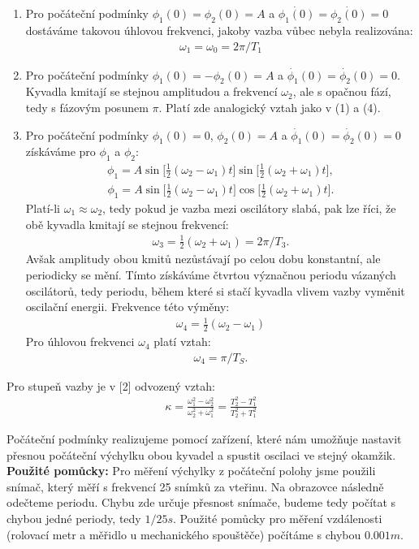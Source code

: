 \documentclass[a4paper]{article}
\begin{document}
\begin{enumerate}
\item Pro počáteční podmínky $\phi_1(0) = \phi_2(0) = A$ a $\Dot{\phi_1(0)} = \Dot{\phi_2(0)} = 0$ dostáváme  takovou úhlovou frekvenci, jakoby vazba vůbec nebyla realizována:
\begin{align}
    \omega_1 = \omega_0 = 2\pi/T_1
\end{align}
\item Pro počáteční podmínky $\phi_1(0) = -\phi_2(0) = A$ a $\Dot{\phi_1}(0) = \Dot{\phi_2}(0) = 0$. Kyvadla kmitají se stejnou amplitudou a frekvencí $\omega_2$, ale s opačnou fází, tedy s fázovým posunem $\pi$. Platí zde analogický vztah jako v (1) a (4). 
\item Pro počáteční podmínky $\phi_1(0)=0$, $\phi_2(0)=A$ a $\Dot{\phi_1}(0) = \Dot{\phi_2}(0) = 0$ získáváme pro $\phi_1$ a $\phi_2$:
\begin{align}
    \phi_1 = A\sin\Big[\frac{1}{2}(\omega_2-\omega_1)t\Big]\sin\Big[\frac{1}{2}(\omega_2+\omega_1)t\Big],
\end{align}
\begin{align}
    \phi_1 = A\sin\Big[\frac{1}{2}(\omega_2-\omega_1)t\Big]\cos\Big[\frac{1}{2}(\omega_2+\omega_1)t\Big].
\end{align}
Platí-li $\omega_1 \approx \omega_2$, tedy pokud je vazba mezi oscilátory slabá, pak lze říci, že obě kyvadla kmitají se stejnou frekvencí:
\begin{align}
    \omega_3 = \frac{1}{2}(\omega_2 + \omega_1) = 2\pi/T_3.
\end{align}
Avšak amplitudy obou kmitů nezůstávají po celou dobu konstantní, ale periodicky se mění. Tímto získáváme čtvrtou význačnou periodu vázaných oscilátorů, tedy periodu, během které si stačí kyvadla vlivem vazby vyměnit oscilační energii. Frekvence této výměny:
\begin{align}
    \omega_4 = \frac{1}{2}(\omega_2-\omega_1)
\end{align}
Pro úhlovou frekvenci $\omega_4$ platí vztah:
\begin{align}
    \omega_4 = \pi/T_S.
\end{align}
\end{enumerate}
\par Pro stupeň vazby je v [2] odvozený vztah:
\begin{align}
    \kappa = \frac{\omega_1^2-\omega_2^2}{\omega_2^2+\omega_1^2} = \frac{T_2^2-T_1^2}{T_2^2+T_1^2}
\end{align}
\par Počáteční podmínky realizujeme pomocí zařízení, které nám umožňuje nastavit přesnou počáteční výchylku obou kyvadel a spustit oscilaci ve stejný okamžik. 
\newline
\newline \textbf{Použité pomůcky:}
\newline Pro měření výchylky z  počáteční polohy jsme použili snímač, který měří s frekvencí 25 snímků za vteřinu. Na obrazovce následně odečteme periodu. Chybu zde určuje přesnost snímače, budeme tedy počítat s chybou jedné periody, tedy $1/25 s$. Použité pomůcky pro měření vzdálenosti (rolovací metr a měřidlo u mechanického spouštěče) počítáme s chybou $0.001 m$.
\newpage
\end{document}
